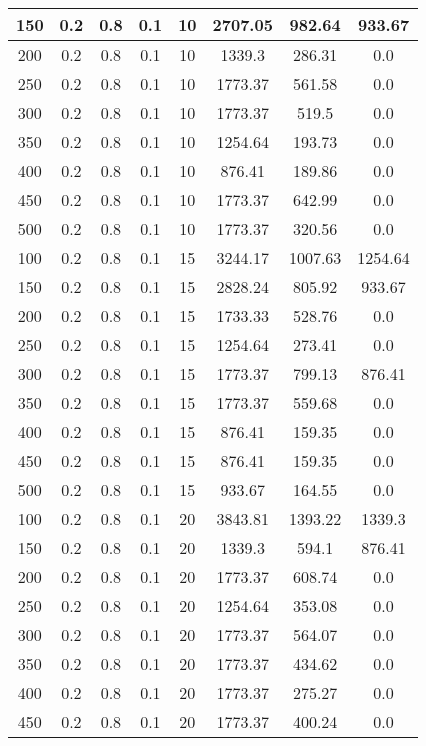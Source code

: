 \documentclass[a4paper, 12pt]{extreport}
\begin{document}
\begin{itemize}
\begin{longtable}{|c|c|c|c|c|c|c|c|}
			150 & 0.2 & 0.8 & 0.1 & 10 & 2707.05 & 982.64 & 933.67 \\\hline
			200 & 0.2 & 0.8 & 0.1 & 10 & 1339.3 & 286.31 & 0.0 \\\hline
			250 & 0.2 & 0.8 & 0.1 & 10 & 1773.37 & 561.58 & 0.0 \\\hline
			300 & 0.2 & 0.8 & 0.1 & 10 & 1773.37 & 519.5 & 0.0 \\\hline
			350 & 0.2 & 0.8 & 0.1 & 10 & 1254.64 & 193.73 & 0.0 \\\hline
			400 & 0.2 & 0.8 & 0.1 & 10 & 876.41 & 189.86 & 0.0 \\\hline
			450 & 0.2 & 0.8 & 0.1 & 10 & 1773.37 & 642.99 & 0.0 \\\hline
			500 & 0.2 & 0.8 & 0.1 & 10 & 1773.37 & 320.56 & 0.0 \\\hline
			100 & 0.2 & 0.8 & 0.1 & 15 & 3244.17 & 1007.63 & 1254.64 \\\hline
			150 & 0.2 & 0.8 & 0.1 & 15 & 2828.24 & 805.92 & 933.67 \\\hline
			200 & 0.2 & 0.8 & 0.1 & 15 & 1733.33 & 528.76 & 0.0 \\\hline
			250 & 0.2 & 0.8 & 0.1 & 15 & 1254.64 & 273.41 & 0.0 \\\hline
			300 & 0.2 & 0.8 & 0.1 & 15 & 1773.37 & 799.13 & 876.41 \\\hline
			350 & 0.2 & 0.8 & 0.1 & 15 & 1773.37 & 559.68 & 0.0 \\\hline
			400 & 0.2 & 0.8 & 0.1 & 15 & 876.41 & 159.35 & 0.0 \\\hline
			450 & 0.2 & 0.8 & 0.1 & 15 & 876.41 & 159.35 & 0.0 \\\hline
			500 & 0.2 & 0.8 & 0.1 & 15 & 933.67 & 164.55 & 0.0 \\\hline
			100 & 0.2 & 0.8 & 0.1 & 20 & 3843.81 & 1393.22 & 1339.3 \\\hline
			150 & 0.2 & 0.8 & 0.1 & 20 & 1339.3 & 594.1 & 876.41 \\\hline
			200 & 0.2 & 0.8 & 0.1 & 20 & 1773.37 & 608.74 & 0.0 \\\hline
			250 & 0.2 & 0.8 & 0.1 & 20 & 1254.64 & 353.08 & 0.0 \\\hline
			300 & 0.2 & 0.8 & 0.1 & 20 & 1773.37 & 564.07 & 0.0 \\\hline
			350 & 0.2 & 0.8 & 0.1 & 20 & 1773.37 & 434.62 & 0.0 \\\hline
			400 & 0.2 & 0.8 & 0.1 & 20 & 1773.37 & 275.27 & 0.0 \\\hline
			450 & 0.2 & 0.8 & 0.1 & 20 & 1773.37 & 400.24 & 0.0 \\\hline

\end{longtable}
\end{itemize}
\end{document}
